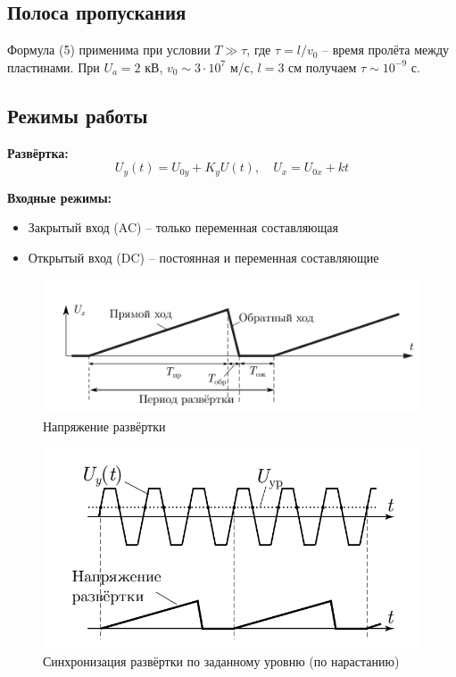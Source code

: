 \documentclass[a4paper, 12pt]{article}
\begin{document}
\subsection*{Полоса пропускания}

Формула (5) применима при условии $T \gg \tau$, где $\tau = l/v_0$ -- время пролёта между пластинами. При $U_a = 2$ кВ, $v_0 \sim 3\cdot10^7$ м/с, $l = 3$ см получаем $\tau \sim 10^{-9}$ с.

\subsection*{Режимы работы}

\textbf{Развёртка:}
\begin{equation}
U_y(t) = U_{0y} + K_yU(t), \quad U_x = U_{0x} + kt
\end{equation}

\textbf{Входные режимы:}
\begin{itemize}
\item Закрытый вход (AC) -- только переменная составляющая
\item Открытый вход (DC) -- постоянная и переменная составляющие
\end{itemize}

\begin{figure}[h]
\centering
\includegraphics[width=0.8\linewidth]{рис 3.png}
\caption{Напряжение развёртки}
\label{fig:voltage_current}
\end{figure}

\begin{figure}[h]
\centering
\includegraphics[width=0.75\linewidth]{рис 4.png}
\caption{Синхронизация развёртки по заданному уровню (по нарастанию)
}
\label{fig:voltage_current}
\end{figure}
\end{document}
